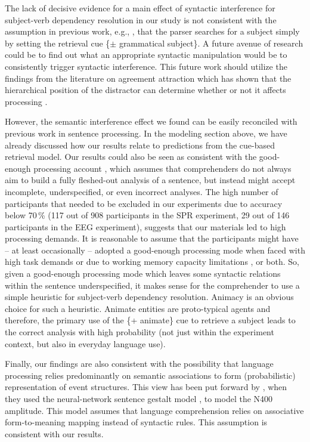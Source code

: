 \documentclass[review,preprint,12pt,authoryear,floatsintext]{elsarticle}
\begin{document}
{The lack of decisive evidence for a main effect of syntactic interference for subject-verb dependency resolution in our study is not consistent with the assumption in previous work, e.g., \cite{vandyke07,mertzen}, that the parser searches for a subject simply by setting the retrieval cue \{$\pm$ grammatical subject\}. {A future avenue of research could be to find out what an appropriate syntactic manipulation would be to consistently trigger syntactic interference. This future work should utilize the findings from the literature on agreement attraction which has shown that the hierarchical position of the distractor can determine whether or not it affects processing \citep{franck2002subject, franck2006agreement, franck2020hierarchical, parker2018not}.}\label{future_work} 

However, the semantic interference effect we found can be easily reconciled with previous work in  sentence processing. In the modeling section above, we have already discussed how our results relate to predictions from the \citet{Lewis2005} cue-based retrieval model.  
 Our results could also be seen as consistent with the good-enough processing account \citep{ferreira2007goodenough}, which assumes that comprehenders do not always aim to build a fully fleshed-out analysis of a sentence, but instead might accept incomplete, underspecified, or even incorrect analyses. The high number of participants that needed to be excluded in our experiments due to accuracy below 70\,\% (117 out of 908 participants in the SPR experiment, 29 out of 146 participants in the EEG experiment), suggests that our materials led to high processing demands. It is reasonable to assume that the participants might have -- at least occasionally -- adopted a good-enough processing mode when faced with high task demands \citep{swets2008underspecification,LogacevMultiple,LogacevVasishthQJEP2016} or due to working memory capacity limitations \citep{MalsburgVasishth2013}, or both. So, given a good-enough processing mode which leaves some syntactic relations within the sentence underspecified, it makes sense for the comprehender to use a simple heuristic for subject-verb dependency resolution. Animacy is an obvious choice for such a heuristic. Animate entities are proto-typical agents \citep{dowty1991thematic} and therefore, the primary use of the \{+ animate\} cue to retrieve a subject leads to the correct analysis with high probability (not just within the experiment context, but also in everyday language use). 
 
Finally, our findings are also consistent with the possibility that language processing relies predominantly on semantic associations to form (probabilistic)
representation of event structures. This view has been put forward by \cite{rabovsky_etal_2018}, when they used the neural-network sentence gestalt model \citep{mcclelland1989_sentence_gestalt}, to model the N400 amplitude. This model assumes that language comprehension relies on associative form-to-meaning mapping instead of syntactic rules. This assumption is consistent with our results.

}
\end{document}
